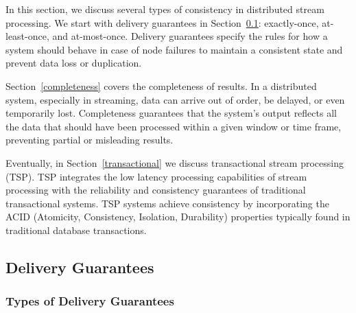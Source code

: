In this section, we discuss several types of consistency in distributed stream processing. We start with delivery guarantees in Section~\ref{delivery_guarantees}: exactly-once, at-least-once, and at-most-once. Delivery guarantees specify the rules for how a system should behave in case of node failures to maintain a consistent state and prevent data loss or duplication.

Section~\ref{completeness} covers the completeness of results.  In a distributed system, especially in streaming, data can arrive out of order, be delayed, or even temporarily lost. Completeness guarantees that the system's output reflects all the data that should have been processed within a given window or time frame, preventing partial or misleading results.

Eventually, in Section~\ref{transactional} we discuss transactional stream processing (TSP). TSP integrates the low latency processing capabilities of stream processing with the reliability and consistency guarantees of traditional transactional systems. TSP systems achieve consistency by incorporating the ACID (Atomicity, Consistency, Isolation, Durability) properties typically found in traditional database transactions.


\subsection{Delivery Guarantees}
\label{delivery_guarantees}

\subsubsection{Types of Delivery Guarantees}

